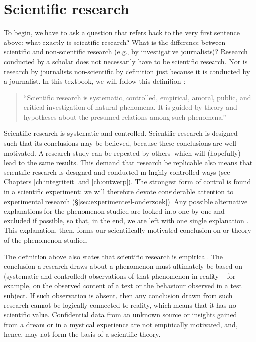\documentclass[
]{book}
\begin{document}
\hypertarget{sec:scientific-research}{%
\section{Scientific research}\label{sec:scientific-research}}

To begin, we have to ask a question that refers back to the very first sentence above: what exactly is scientific research? What is the difference between scientific and non-scientific research (e.g., by investigative journalists)? Research conducted by a scholar does not necessarily have to be scientific research. Nor is research by journalists non-scientific by definition just because it is conducted by a journalist. In this textbook, we will follow this definition \citep[p.14]{KL00}:

\begin{quote}
``Scientific
research is systematic, controlled, empirical, amoral, public, and
critical investigation of natural phenomena. It is guided by theory and hypotheses about the presumed relations among such phenomena.''
\end{quote}

Scientific research is systematic and controlled. Scientific research is designed such that its conclusions may be believed, because these conclusions are well-motivated. A research study can be repeated by others, which will (hopefully) lead to the same results. This demand that research be replicable also means that scientific research is designed and conducted in highly controlled ways (see Chapters \ref{ch:integriteit} and \ref{ch:ontwerp}).
The strongest form of control is found in a scientific experiment: we will therefore devote considerable attention to experimental research (§\ref{sec:experimenteel-onderzoek}). Any possible alternative explanations for the phenomenon studied are looked into one by one and excluded if possible, so that, in the end, we are left with one single explanation \citep{KL00}. This explanation, then, forms our scientifically motivated conclusion on or theory of the phenomenon studied.

The definition above also states that scientific research is empirical. The conclusion a research draws about a phenomenon must ultimately be based on (systematic and controlled) observations of that phenomenon in reality -- for example, on the observed content of a text or the behaviour observed in a test subject. If such observation is absent, then any conclusion drawn from such research cannot be logically connected to reality, which means that it has no scientific value. Confidential data from an unknown source or insights gained from a dream or in a mystical experience are not empirically motivated, and, hence, may not form the basis of a scientific theory.
\end{document}

